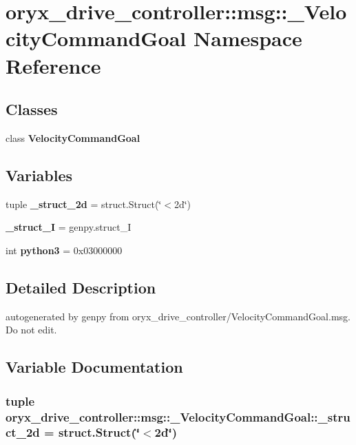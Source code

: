 \section{oryx\-\_\-drive\-\_\-controller\-:\-:msg\-:\-:\-\_\-\-Velocity\-Command\-Goal \-Namespace \-Reference}
\label{namespaceoryx__drive__controller_1_1msg_1_1__VelocityCommandGoal}
\subsection*{\-Classes}
\begin{DoxyCompactItemize}
\item 
class {\bf \-Velocity\-Command\-Goal}
\end{DoxyCompactItemize}
\subsection*{\-Variables}
\begin{DoxyCompactItemize}
\item 
tuple {\bf \-\_\-struct\-\_\-2d} = struct.\-Struct(\char`\"{}$<$2d\char`\"{})
\item 
{\bf \-\_\-struct\-\_\-\-I} = genpy.\-struct\-\_\-\-I
\item 
int {\bf python3} = 0x03000000
\end{DoxyCompactItemize}


\subsection{\-Detailed \-Description}
\begin{DoxyVerb}autogenerated by genpy from oryx_drive_controller/VelocityCommandGoal.msg. Do not edit.\end{DoxyVerb}
 

\subsection{\-Variable \-Documentation}
\subsubsection[{\-\_\-struct\-\_\-2d}]{\setlength{\rightskip}{0pt plus 5cm}tuple {\bf oryx\-\_\-drive\-\_\-controller\-::msg\-::\-\_\-\-Velocity\-Command\-Goal\-::\-\_\-struct\-\_\-2d} = struct.\-Struct(\char`\"{}$<$2d\char`\"{})}\label{namespaceoryx__drive__controller_1_1msg_1_1__VelocityCommandGoal_a32eded622059f1778cc78f0db67be502}


